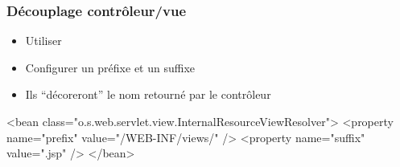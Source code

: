 \begin{frame}[fragile]
 \frametitle{Découplage contrôleur/vue}

 \begin{itemize}
  \item Utiliser 
  \item Configurer un préfixe et un suffixe
  \item Ils ``décoreront'' le nom retourné par le contrôleur
 \end{itemize}

 \begin{xmlcode}
<bean class="o.s.web.servlet.view.InternalResourceViewResolver">
  <property name="prefix" value="/WEB-INF/views/" />
  <property name="suffix" value=".jsp" />
</bean>
 \end{xmlcode}

\end{frame}